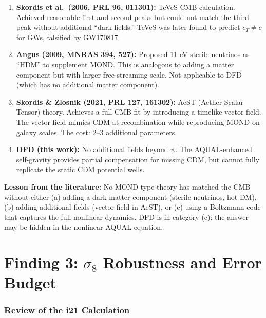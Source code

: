 \documentclass[11pt]{article}
\begin{document}
\begin{enumerate}
\item \textbf{Skordis et al.\ (2006, PRL 96, 011301):}  TeVeS CMB
  calculation.  Achieved reasonable first and second peaks but could not
  match the third peak without additional ``dark fields.''  TeVeS was later
  found to predict $c_T \neq c$ for GWs, falsified by GW170817.

\item \textbf{Angus (2009, MNRAS 394, 527):}  Proposed 11 eV sterile
  neutrinos as ``HDM'' to supplement MOND.  This is analogous to adding a
  matter component but with larger free-streaming scale.  Not applicable
  to DFD (which has no additional matter component).

\item \textbf{Skordis \& Zlosnik (2021, PRL 127, 161302):}  AeST
  (Aether Scalar Tensor) theory.  Achieves a full CMB fit by introducing
  a timelike vector field.  The vector field mimics CDM at recombination
  while reproducing MOND on galaxy scales.  The cost: 2--3 additional
  parameters.

\item \textbf{DFD (this work):}  No additional fields beyond $\psi$.
  The AQUAL-enhanced self-gravity provides partial compensation for missing
  CDM, but cannot fully replicate the static CDM potential wells.
\end{enumerate}

\textbf{Lesson from the literature:}  No MOND-type theory has matched the
CMB without either (a) adding a dark matter component (sterile neutrinos,
hot DM), (b) adding additional fields (vector field in AeST), or (c) using
a Boltzmann code that captures the full nonlinear dynamics.  DFD is in
category (c): the answer may be hidden in the nonlinear AQUAL equation.


\part{Finding 3: $\sigma_8$ Robustness and Error Budget}
\label{part:sigma8}

\section{Review of the i21 Calculation}
\end{document}
